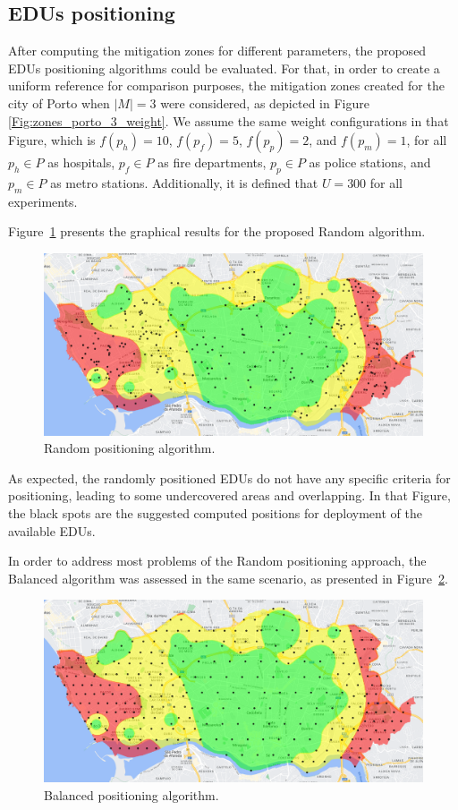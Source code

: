 \begin{refsection}
\subsection{EDUs positioning}

After computing the mitigation zones for different parameters, the proposed EDUs positioning algorithms could be evaluated. For that, in order to create a uniform reference for comparison purposes, the mitigation zones created for the city of Porto when $|M|=3$ were considered, as depicted in Figure \ref{Fig:zones_porto_3_weight}. We assume the same weight configurations in that Figure, which is $f(p_h)=10$, $f(p_f)=5$, $f(p_p)=2$, and $f(p_m)=1$, for all $p_h \in P$ as hospitals, $p_f \in P$ as fire departments, $p_p \in P$ as police stations, and $p_m \in P$ as metro stations. Additionally, it is defined that $U=300$ for all experiments.

Figure~\ref{Fig:edus_random} presents the graphical results for the proposed Random algorithm.

\begin{figure}[htbp!]
  \centering
  \includegraphics[width=0.9\linewidth]{Chapters/2-EDUs/images/porto_M3_random.png}
  \caption{Random positioning algorithm.}\label{Fig:edus_random}
\end{figure}

As expected, the randomly positioned EDUs do not have any specific criteria for positioning, leading to some undercovered areas and overlapping. In that Figure, the black spots are the suggested computed positions for deployment of the available EDUs.

In order to address most problems of the Random positioning approach, the Balanced algorithm was assessed in the same scenario, as presented in Figure~\ref{Fig:edus_balanced}.

\begin{figure}[htbp!]
  \centering
  \includegraphics[width=0.9\linewidth]{Chapters/2-EDUs/images/porto_M3_balanced.png}
  \caption{Balanced positioning algorithm.}\label{Fig:edus_balanced}
\end{figure}


\end{refsection}
